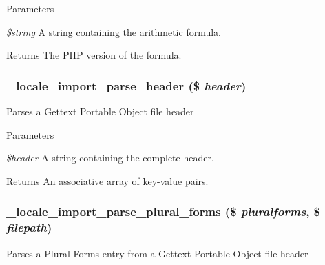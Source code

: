 \begin{DoxyParams}{Parameters}
\item[{\em \$string}]A string containing the arithmetic formula.\end{DoxyParams}
\begin{DoxyReturn}{Returns}
The PHP version of the formula. 
\end{DoxyReturn}
\hypertarget{group__locale_ga1381fc54e922fe478d8ee5cfbe0c3c16}{
\subsubsection[{\_\-locale\_\-import\_\-parse\_\-header}]{\setlength{\rightskip}{0pt plus 5cm}\_\-locale\_\-import\_\-parse\_\-header (\$ {\em header})}}
\label{group__locale_ga1381fc54e922fe478d8ee5cfbe0c3c16}
Parses a Gettext Portable Object file header


\begin{DoxyParams}{Parameters}
\item[{\em \$header}]A string containing the complete header.\end{DoxyParams}
\begin{DoxyReturn}{Returns}
An associative array of key-\/value pairs. 
\end{DoxyReturn}
\hypertarget{group__locale_ga7693cf526c48e5dcb6dffabac7deb775}{
\subsubsection[{\_\-locale\_\-import\_\-parse\_\-plural\_\-forms}]{\setlength{\rightskip}{0pt plus 5cm}\_\-locale\_\-import\_\-parse\_\-plural\_\-forms (\$ {\em pluralforms}, \/  \$ {\em filepath})}}
\label{group__locale_ga7693cf526c48e5dcb6dffabac7deb775}
Parses a Plural-\/Forms entry from a Gettext Portable Object file header


